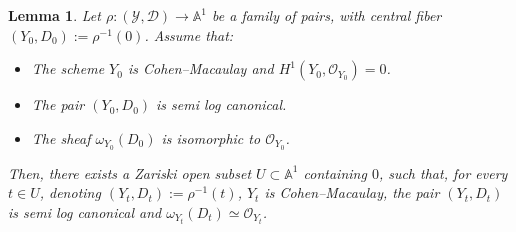 \documentclass[12pt,letterpaper, reqno]{amsart}
\newtheorem{lemma}[theorem]{Lemma}
\theoremstyle{defstyle} \newtheorem{definition}[theorem]{Definition}
\theoremstyle{remark}
\numberwithin{equation}{section}
\numberwithin{figure}{section}
\newcommand{\A} {\mathbb{A}}
\newcommand{\cO} {\mathcal{O}}
\newcommand{\cY} {\mathcal{Y}}
\newcommand{\cD} {\mathcal{D}}
\begin{document}
\begin{lemma} \label{lem_central_general_technical}
Let
$\rho: (\cY, \cD) \rightarrow \A^1$ be a family of pairs, with central fiber $(Y_0, D_0):=\rho^{-1}(0)$. 
Assume that:
\begin{itemize}
    \item[(i)] The scheme $Y_0$ is Cohen--Macaulay and $H^1(Y_0, \cO_{Y_0})=0$.
    \item[(ii)] The pair $(Y_0, D_0)$ is semi log canonical.
    \item[(iii)] The sheaf $\omega_{Y_0}(D_0)$ is isomorphic to $\cO_{Y_0}$.
\end{itemize}
Then, there exists a Zariski open subset $U \subset \A^1$ containing $0$, such that, for every $t\in U$, denoting  
$(Y_t, D_t):=\rho^{-1}(t)$,
$Y_t$ is Cohen--Macaulay, the pair $(Y_t, D_t)$ is semi log canonical and $\omega_{Y_t}(D_t) \simeq \cO_{Y_t}$.
\end{lemma}
\end{document}

